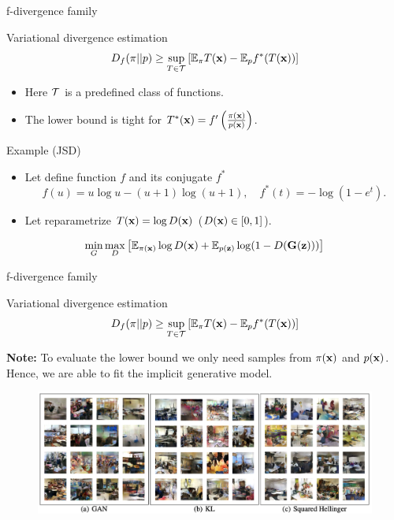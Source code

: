 \documentclass{beamer}
\begin{document}
\begin{frame}{f-divergence family}
	\begin{block}{Variational divergence estimation}
		\vspace{-0.2cm}
		\[
			D_f(\pi || p) \geq \sup_{T \in \mathcal{T}} \left[\mathbb{E}_{\pi}T(\mathbf{x}) -  \mathbb{E}_p f^*(T(\mathbf{x})) \right]
		\]
		\vspace{-0.3cm}
		\begin{itemize}
			\item Here $\mathcal{T}$ is a predefined class of functions.
			\item The lower bound is tight for $T^*(\mathbf{x}) = f'\left( \frac{\pi(\mathbf{x})}{p(\mathbf{x})} \right)$. 
		\end{itemize}
		\vspace{-0.3cm}
	\end{block}
	\begin{block}{Example (JSD)}
		\begin{itemize}
			\item Let define function $f$ and its conjugate $f^*$
			\[ 
				f(u) = u \log u - (u + 1) \log (u + 1), \quad f^*(t) = - \log (1 - e^t).
			\]
			\item Let reparametrize $T(\mathbf{x}) = \log D(\mathbf{x})$ ($D(\mathbf{x}) \in [0, 1]$).
		\end{itemize}
		\vspace{-0.4cm}
	\end{block}
	\[
		\min_{G} \max_D \left[ \mathbb{E}_{\pi(\mathbf{x})} \log D(\mathbf{x}) + \mathbb{E}_{p(\mathbf{z})} \log (1 - D(\mathbf{G}(\mathbf{z}))) \right]
	\]

\end{frame}
\begin{frame}{f-divergence family}
	\begin{block}{Variational divergence estimation}
		\[
			D_f(\pi || p) \geq \sup_{T \in \mathcal{T}} \left[\mathbb{E}_{\pi}T(\mathbf{x}) -  \mathbb{E}_p f^*(T(\mathbf{x})) \right]
		\]
		\vspace{-0.3cm}
	\end{block}
	\textbf{Note:} To evaluate the lower bound we only need samples from $\pi(\mathbf{x})$ and $p(\mathbf{x})$. Hence, we are able to fit the implicit generative model.
	\begin{figure}
		\centering
		\includegraphics[width=1.0\linewidth]{figs/f_div_results}
	\end{figure}

\end{frame}
\end{document}
